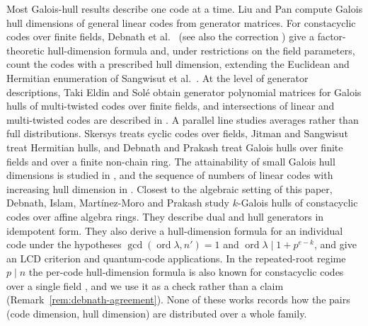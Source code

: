 Most Galois-hull results describe one code at a time. Liu and Pan
\cite{liuPan2020} compute Galois hull dimensions of general linear codes from
generator matrices. For constacyclic codes over finite fields, Debnath et
al.\ \cite{debnathConstacyclic2023} (see also the correction
\cite{debnathCorrection2023}) give a factor-theoretic hull-dimension
formula and, under restrictions on the field parameters, count the codes
with a prescribed hull dimension, extending the Euclidean and Hermitian
enumeration of Sangwisut et al.\ \cite{sangwisut2015}. At the level of
generator descriptions, Taki Eldin and Sol\'e \cite{eldinSole2026} obtain
generator polynomial matrices for Galois hulls of multi-twisted codes over
finite fields, and intersections of linear and multi-twisted codes are
described in \cite{eldinLeroy2026}. A parallel line studies averages rather than full
distributions. Skersys \cite{skersys2003} treats cyclic codes over fields,
Jitman and Sangwisut \cite{jitmanSangwisut2018} treat Hermitian hulls, and
Debnath and Prakash \cite{debnathAverage2025} treat Galois hulls over finite
fields and over a finite non-chain ring. The attainability of small Galois
hull dimensions is studied in \cite{debnathSmall2026}, and the sequence of
numbers of linear codes with increasing hull dimension in
\cite{bouyuklieva2026}. Closest to the
algebraic setting of this paper, Debnath, Islam, Mart\'inez-Moro and Prakash
\cite{debnathAffine2026} study $k$-Galois hulls of constacyclic codes over
affine algebra rings. They describe dual and hull generators in idempotent
form. They also derive a hull-dimension formula for an individual code under the
hypotheses $\gcd(\operatorname{ord}\lambda,n')=1$ and
$\operatorname{ord}\lambda\mid 1+p^{e-k}$, and give an LCD criterion and
quantum-code applications. In the repeated-root regime $p\mid n$ the
per-code hull-dimension formula is also known for constacyclic codes over a
single field \cite{debnathConstacyclic2023}, and we use it as a check rather
than a claim (Remark~\ref{rem:debnath-agreement}). None of these works
records how the pairs (code dimension, hull dimension) are distributed over
a whole family.

